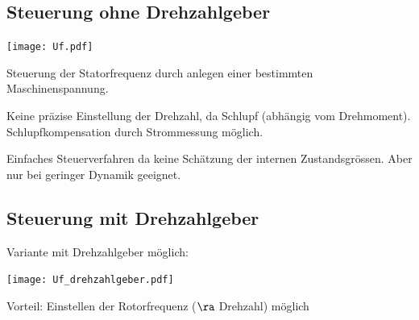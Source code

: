\documentclass[german]{latex4ei_fs}
\begin{document}
\begin{sectionbox}

\subsection{Steuerung ohne Drehzahlgeber}
\texttt{[image: Uf.pdf]}

Steuerung der Statorfrequenz durch anlegen einer bestimmten Maschinenspannung.

Keine präzise Einstellung der Drehzahl, da Schlupf (abhängig vom Drehmoment). Schlupfkompensation durch Strommessung möglich.

Einfaches Steuerverfahren da keine Schätzung der internen Zustandsgrössen. Aber nur bei geringer Dynamik geeignet.


\end{sectionbox}
\begin{sectionbox}

\subsection{Steuerung mit  Drehzahlgeber}

Variante mit Drehzahlgeber möglich: 

\texttt{[image: Uf\_drehzahlgeber.pdf]}

Vorteil: Einstellen der Rotorfrequenz ($\ra$ Drehzahl) möglich
\end{sectionbox}
\end{document}
